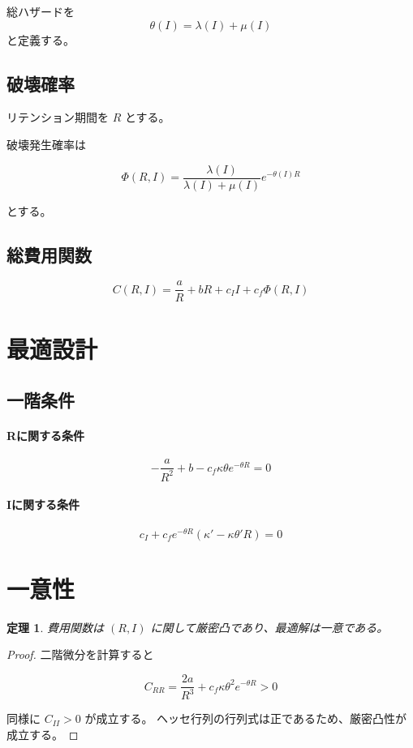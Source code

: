 \documentclass[12pt,a4paper]{article}
\theoremstyle{plain}
\newtheorem{theorem}{定理}
\begin{document}
総ハザードを
\[
\theta(I)=\lambda(I)+\mu(I)
\]
と定義する。

\subsection{破壊確率}

リテンション期間を $R$ とする。

破壊発生確率は

\[
\Phi(R,I)=\frac{\lambda(I)}{\lambda(I)+\mu(I)}e^{-\theta(I)R}
\]

とする。

\subsection{総費用関数}

\[
C(R,I)=\frac{a}{R}+bR+c_I I+c_f \Phi(R,I)
\]

\section{最適設計}

\subsection{一階条件}

\paragraph{Rに関する条件}

\[
-\frac{a}{R^2}+b-c_f \kappa \theta e^{-\theta R}=0
\]

\paragraph{Iに関する条件}

\[
c_I+c_f e^{-\theta R}(\kappa'-\kappa\theta'R)=0
\]

\section{一意性}

\begin{theorem}
費用関数は $(R,I)$ に関して厳密凸であり、最適解は一意である。
\end{theorem}

\begin{proof}
二階微分を計算すると

\[
C_{RR}=\frac{2a}{R^3}+c_f\kappa\theta^2 e^{-\theta R}>0
\]

同様に $C_{II}>0$ が成立する。
ヘッセ行列の行列式は正であるため、厳密凸性が成立する。
\end{proof}
\end{document}
